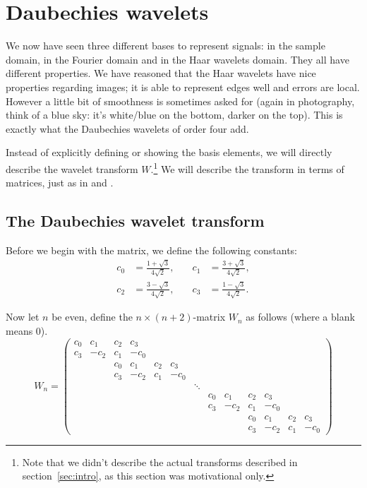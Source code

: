 
\section{Daubechies wavelets}
\label{sec:dau}
We now have seen three different bases to represent signals: in the sample domain, in the Fourier domain and in the Haar wavelets domain. They all have different properties. We have reasoned that the Haar wavelets have nice properties regarding images; it is able to represent edges well and errors are local. However a little bit of smoothness is sometimes asked for (again in photography, think of a blue sky: it's white/blue on the bottom, darker on the top). This is exactly what the Daubechies wavelets of order four add.

Instead of explicitly defining or showing the basis elements, we will directly describe the wavelet transform $W$.\footnote{Note that we didn't describe the actual transforms described in section~\ref{sec:intro}, as this section was motivational only.} We will describe the transform in terms of matrices, just as in \cite{numc} and \cite{biss}.


\subsection{The Daubechies wavelet transform}
Before we begin with the matrix, we define the following constants:
\begin{align*}
	c_0 &= \frac{1 + \sqrt{3}}{4 \sqrt{2}}, &\quad
	c_1 &= \frac{3 + \sqrt{3}}{4 \sqrt{2}}, \\
	c_2 &= \frac{3 - \sqrt{3}}{4 \sqrt{2}}, &\quad
	c_3 &= \frac{1 - \sqrt{3}}{4 \sqrt{2}}.
\end{align*}

Now let $n$ be even, define the $n \times (n+2)$-matrix $W_n$ as follows (where a blank means $0$).
\[ W_n =
\begin{pmatrix}
	c_0 &  c_1 & c_2 &  c_3 &     &      & & & & & & & \\
	c_3 & -c_2 & c_1 & -c_0 &     &      & & & & & & & \\
	    &      & c_0 &  c_1 & c_2 &  c_3 & & & & & & & \\
	    &      & c_3 & -c_2 & c_1 & -c_0 & & & & & & & \\

	& & & & & & \ddots & & & & & & \\

	& & & & & & & c_0 &  c_1 & c_2 &  c_3 &     &      \\
	& & & & & & & c_3 & -c_2 & c_1 & -c_0 &     &      \\
	& & & & & & &     &      & c_0 &  c_1 & c_2 &  c_3 \\
	& & & & & & &     &      & c_3 & -c_2 & c_1 & -c_0
\end{pmatrix} \]

